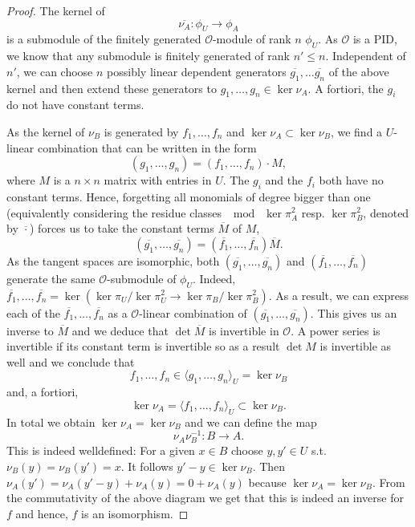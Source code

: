 \documentclass{article}
\theoremstyle{plain}%
\theoremstyle{definition}
\theoremstyle{remark}
\begin{document}
\begin{proof}
    The kernel of
    \[
        \overline{\nu_A} \colon \phi_U \to \phi_A  
    \]
    is a submodule of the finitely generated \(\mathcal{O}\)-module of rank \(n\) \(\phi_U\).
    As \(\mathcal{O}\) is a PID, we know that any submodule is finitely generated of rank \(n' \leq n\).
    Independent of \(n'\), we can choose \(n\) possibly linear dependent generators 
    \(\overline{g_1}, \dots \overline{g_n}\) of the above kernel and then extend these generators to 
    \(g_1, \dots, g_n \in \ker \nu_A\). A fortiori, the \(g_i\) do not have constant terms.

    As the kernel of \(\nu_B\) is generated by \(f_1, \dots, f_n\) and \(\ker \nu_A \subset \ker \nu_B\),
    we find a \(U\)-linear combination that can be written in the form
    \[
        (g_1, \dots, g_n) = (f_1, \dots, f_n) \cdot M,
    \]
    where \(M\) is a \(n \times n\) matrix with entries in \(U\).
    The \(g_i\) and the \(f_i\) both have no constant terms. Hence, forgetting all monomials 
    of degree bigger than one (equivalently considering the residue classes \(\mod\;\ker \pi_A^2\) 
    resp. \(\ker \pi_B^2\), denoted by \(\overline{\cdot}\)) forces us to take the constant terms \(\overline{M}\) of \(M\),
    \[
        (\overline{g_1}, \dots, \overline{g_n}) = (\overline{f_1}, \dots, \overline{f_n})\overline{M}.
    \]
    As the tangent spaces are isomorphic, both \((\overline{g_1}, \dots, \overline{g_n})\) and 
    \((\overline{f_1}, \dots, \overline{f_n})\) generate the same \(\mathcal{O}\)-submodule of
    \(\phi_U\).
    Indeed, 
    \(\overline{f_1}, \dots, \overline{f_n} = \ker( \ker \pi_U/\ker \pi_U^2 \to \ker \pi_B/\ker \pi_B^2)\).
    As a result, we can express each of the \(\overline{f_1}, \dots, \overline{f_n}\) as a 
    \(\mathcal{O}\)-linear combination of \((\overline{g_1}, \dots, \overline{g_n})\).
    This gives us an inverse to \(\overline{M}\) and we deduce that \(\det \overline{M}\) is invertible
    in \(\mathcal{O}\).
    A power series is invertible if its constant term is invertible so as a result \(\det M\) is invertible
    as well and we conclude that 
    \[ 
        f_1, \dots, f_n \in \langle g_1, \dots, g_n\rangle_U = \ker \nu_B
    \]
    and, a fortiori, 
    \[
        \ker \nu_A = \langle f_1, \dots, f_n\rangle_U \subset \ker \nu_B.
    \]
    In total we obtain \(\ker \nu_A = \ker \nu_B\) and we can define the map 
    \[
        \nu_A\nu_B^{-1}\colon B \to A.  
    \]
    This is indeed welldefined: For a given \(x \in B\) choose \(y, y' \in U\) s.t. 
    \(\nu_B(y) = \nu_B(y') = x\). It follows \(y' - y \in \ker \nu_B\). 
    Then \(\nu_A(y') = \nu_A(y'-y) + \nu_A(y) = 0 + \nu_A(y)\) because \(\ker \nu_A = \ker \nu_B\).
    From the commutativity of the above diagram we get that this is indeed an inverse for \(f\) and
    hence, \(f\) is an isomorphism.
\end{proof}
\end{document}
